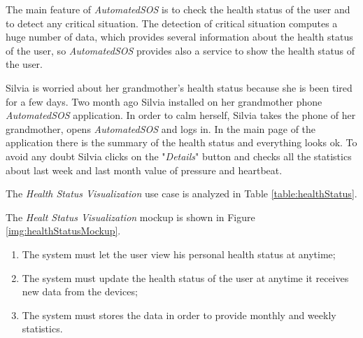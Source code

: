 The main feature of \textit{AutomatedSOS} is to check the health status of the user and to detect any critical situation.
The detection of critical situation computes a huge number of data, which provides several information about the health status of the user, so \textit{AutomatedSOS} provides also a service to show the health status of the user.

Silvia is worried about her grandmother's health status because she is been tired for a few days. Two month ago Silvia installed on her grandmother phone \textit{AutomatedSOS} application.
In order to calm herself, Silvia takes the phone of her grandmother, opens \textit{AutomatedSOS} and logs in.
In the main page of the application there is the summary of the health status and everything looks ok.
To avoid any doubt Silvia clicks on the "\textit{Details}" button and checks all the statistics about last week and last month value of pressure and heartbeat.

The \textit{Health Status Visualization} use case is analyzed in Table \ref{table:healthStatus}.

The \textit{Healt Status Visualization} mockup is shown in Figure \ref{img:healthStatusMockup}.

\begin{enumerate}
  \item The system must let the user view his personal health status at anytime;
  \item The system must update the health status of the user at anytime it receives new data from the devices;
  \item The system must stores the data in order to provide monthly and weekly statistics.
\end{enumerate}

